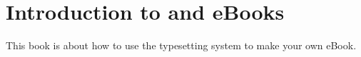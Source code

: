 
\chapter{Introduction to \latex and eBooks}

This book is about how to use the \latex typesetting system to make your own eBook.
